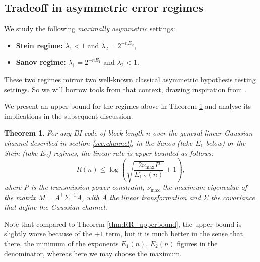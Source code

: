 \documentclass[10pt,conference]{IEEEtran}
\newtheorem{theorem}{Theorem}
\newcommand{\1}{\mathds{1}}
\begin{document}
\subsection{Tradeoff in asymmetric error regimes}
\label{ssec:asymmetric}
We study the following \emph{maximally asymmetric} settings:
\begin{itemize}
    \item \textbf{Stein regime:} $\lambda_1<1$ and $\lambda_2=2^{-nE_2}$,
    \item \textbf{Sanov regime:} $\lambda_1=2^{-nE_1}$ and $\lambda_2<1$.
\end{itemize} 
These two regimes mirror two well-known classical asymmetric hypothesis testing settings. So we will borrow tools from that context, drawing inspiration from \cite{DI-steins}. 

We present an upper bound for the regimes above in Theorem \ref{thm:stein_upperbound} and analyse its implications in the subsequent discussion.

\begin{theorem}
\label{thm:stein_upperbound}
For any DI code of block length $n$ over the general linear Gaussian channel described in section \ref{sec:channel}, in the Sanov (take $E_1$ below) or the Stein (take $E_2$) regimes, the linear rate is upper-bounded as follows:
\[
  R(n) \leq \log\left(\sqrt{\frac{2\nu_{\max}P}{E_{1,2}(n)}}+1\right),
\]
where $P$ is the transmission power constraint, $\nu_{\max}$ the maximum eigenvalue of the matrix $M=A^\top\Sigma^{-1}A$, with $A$ the linear transformation and $\Sigma$ the covariance that define the Gaussian channel.
\end{theorem}

Note that compared to Theorem \ref{thm:RR_upperbound}, the upper bound is slightly worse because of the $+1$ term, but it is much better in the sense that there, the minimum of the exponents $E_1(n),\,E_2(n)$ figures in the denominator, whereas here we may choose the maximum.
\end{document}
